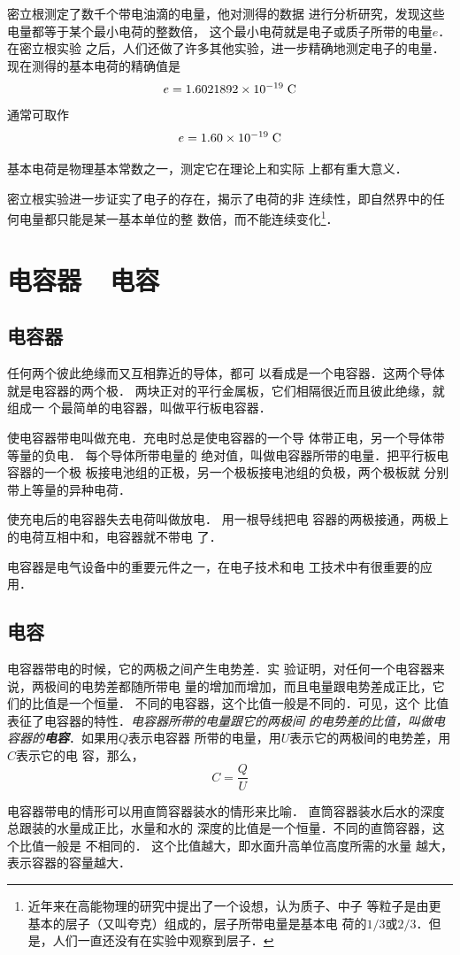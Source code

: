 密立根测定了数千个带电油滴的电量，他对测得的数据
进行分析研究，发现这些电量都等于某个最小电荷的整数倍，
这个最小电荷就是电子或质子所带的电量$e$．在密立根实验
之后，人们还做了许多其他实验，进一步精确地测定电子的电量．
现在测得的基本电荷的精确值是
\[e=1.6021892\times10^{-19} \;\text{C} \]
通常可取作
\[e=1.60\times10^{-19} \;\text{C} \]

基本电荷是物理基本常数之一，测定它在理论上和实际
上都有重大意义．

密立根实验进一步证实了电子的存在，揭示了电荷的非
连续性，即自然界中的任何电量都只能是某一基本单位的整
数倍，而不能连续变化\footnote{近年来在高能物理的研究中提出了一个设想，认为质子、中子
等粒子是由更基本的层子（又叫夸克）组成的，层子所带电量是基本电
荷的$1/3$或$2/3$．但是，人们一直还没有在实验中观察到层子．}．

\section{电容器~~电容}
\subsection{电容器}
任何两个彼此绝缘而又互相靠近的导体，都可
以看成是一个电容器．这两个导体就是电容器的两个极．
两块正对的平行金属板，它们相隔很近而且彼此绝缘，就组成一
个最简单的电容器，叫做平行板电容器．

使电容器带电叫做充电．充电时总是使电容器的一个导
体带正电，另一个导体带等量的负电．
每个导体所带电量的
绝对值，叫做电容器所带的电量．把平行板电容器的一个极
板接电池组的正极，另一个极板接电池组的负极，两个极板就
分别带上等量的异种电荷．

使充电后的电容器失去电荷叫做放电．
用一根导线把电
容器的两极接通，两极上的电荷互相中和，电容器就不带电
了．

电容器是电气设备中的重要元件之一，在电子技术和电
工技术中有很重要的应用．

\subsection{电容}
电容器带电的时候，它的两极之间产生电势差．实
验证明，对任何一个电容器来说，两极间的电势差都随所带电
量的增加而增加，而且电量跟电势差成正比，它们的比值是一个恒量．
不同的电容器，这个比值一般是不同的．可见，这个
比值表征了电容器的特性．\textit{电容器所带的电量跟它的两极间
的电势差的比值，叫做电容器的\textbf{电容}}．如果用$Q$表示电容器
所带的电量，用$U$表示它的两极间的电势差，用$C$表示它的电
容，那么，
\[C=\frac{Q}{U} \]

电容器带电的情形可以用直筒容器装水的情形来比喻．
直筒容器装水后水的深度总跟装的水量成正比，水量和水的
深度的比值是一个恒量．不同的直筒容器，这个比值一般是
不相同的．
这个比值越大，即水面升高单位高度所需的水量
越大，表示容器的容量越大．

